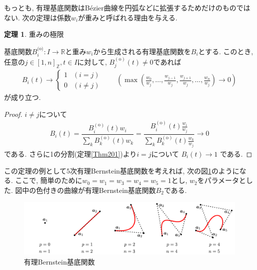 \documentclass{jsarticle}
\newcommand\setR{\mathbb{R}}
\newcommand\Pare[1]{\left(#1\right)}
\newcommand\squa[1]{[#1]}
\newcommand\Z[2]{\squa{#1,#2}_\mathbb{Z}}
\theoremstyle{definition}%
\newtheorem{thm}{定理}
\begin{document}
もっとも, 有理基底関数はB\'ezier曲線を円弧などに拡張するためだけのものではない.
次の定理は係数$w_i$が重みと呼ばれる理由を与える.
\begin{screen}
	\begin{thm}
		重みの極限

		基底関数$B_i^{\text{(o)}}:I\to\setR$と重み$w_i$から生成される有理基底関数を$B_i$とする.
        このとき, 任意の$j\in\Z{1}{n}, t\in I$に対して, $B_{j}^{(\text{o})}(t)\neq 0$であれば
		\begin{align}
			B_i(t)\to
			\begin{cases}
				1 &(i=j) \\
				0 &(i\neq j)
			\end{cases} \qquad
            \Pare{\max\Pare{\frac{w_0}{w_{j}},\dots,\frac{w_{{j}-1}}{w_{j}},\frac{w_{{j}+1}}{w_{j}},\dots,\frac{w_n}{w_{j}}}
			\to
			0}
		\end{align}
		が成り立つ.
	\end{thm}
\end{screen}
\begin{proof}
	$i\neq j$について
	\begin{align}
		B_i(t)
		=
		\dfrac{B_{i}^{(\text{o})}(t)w_i}{\sum\limits_{k}B_{k}^{(\text{o})}(t)w_k}
		=
		\dfrac{B_{i}^{(\text{o})}(t)\frac{w_i}{w_{j}}}{\sum\limits_{k}B_{k}^{(\text{o})}(t)\frac{w_k}{w_{j}}}
		\to
		0
	\end{align}
	である.
	さらに1の分割(定理\ref{Thm201})より$i=j$について
	$B_i(t)\to 1$
    である.
\end{proof}
\newpage
この定理の例として$5$次有理Bernstein基底関数を考えれば, 次の図\ref{Fig212}のようになる.
ここで, 簡単のために$w_0=w_1=w_3=w_4=w_5=1$とし, $w_2$をパラメータとした.
図中の色付きの曲線が有理Bernstein基底関数$B_2$である.
\addtocounter{footnote}{-1}
\begin{figure}[H]
	\centering
    \includegraphics[page=6,clip,width=160mm]{fig.pdf}
	\caption{有理Bernstein基底関数\protect \footnotemark}
	\label{Fig212}
\end{figure}
\end{document}
